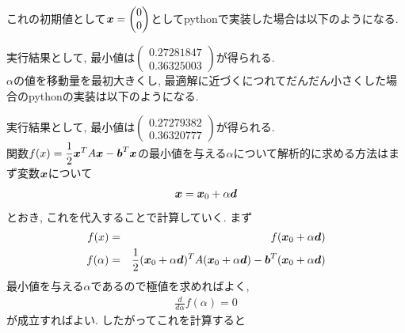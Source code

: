\documentclass[dvipdfmx,a4j]{jsarticle}
\begin{document}
                  これの初期値として$\mbox{\boldmath $x$}=\begin{pmatrix}0\\0\end{pmatrix}$としてpythonで実装した場合は以下のようになる.
                  

                  実行結果として, 最小値は$\begin{pmatrix}0.27281847\\0.36325003\end{pmatrix}$が得られる.\\
                  $\alpha$の値を移動量を最初大きくし, 最適解に近づくにつれてだんだん小さくした場合のpythonの実装は以下のようになる.
                  
                  実行結果として, 最小値は$\begin{pmatrix}0.27279382\\0.36320777\end{pmatrix}$が得られる.\\[1cm]
                  関数$\displaystyle f(x)=\frac{1}{2}\mbox{\boldmath $x$}^{T}A\mbox{\boldmath $x$}-\mbox{\boldmath $b$}^{T}\mbox{\boldmath $x$}$の最小値を与える$\alpha$について解析的に求める方法はまず変数$\mbox{\boldmath $x$}$について
                  \begin{eqnarray*}
                    \mbox{\boldmath $x$} = \mbox{\boldmath $x$}_{0}+\alpha \mbox{\boldmath $d$}
                  \end{eqnarray*}
                  とおき, これを代入することで計算していく.
                  まず
                  \begin{eqnarray*}
                    f(x) &=& f(\mbox{\boldmath $x$}_{0}+\alpha\mbox{\boldmath $d$})\\
                    f(\alpha) &=& \frac{1}{2}(\mbox{\boldmath $x$}_{0}+\alpha \mbox{\boldmath $d$})^{T}A(\mbox{\boldmath $x$}_{0}+\alpha \mbox{\boldmath $d$})-\mbox{\boldmath $b$}^{T}(\mbox{\boldmath $x$}_{0}+\alpha \mbox{\boldmath $d$})
                  \end{eqnarray*}
                  最小値を与える$\alpha$であるので極値を求めればよく,
                  \begin{eqnarray*}
                    \frac{d}{d\alpha}f(\alpha) = 0
                  \end{eqnarray*}
                  が成立すればよい.
                  したがってこれを計算すると
\end{document}

